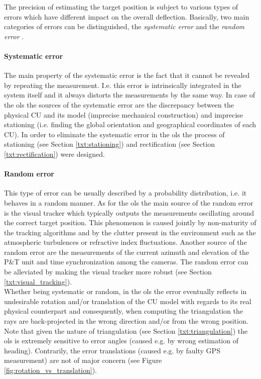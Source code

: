 The precision of estimating the target position is subject to various types of errors which have different impact on the overall deflection. Basically, two main categories of errors can be distinguished, the \textit{systematic error} and the \textit{random error} \cite{taylor1997introduction}.

\paragraph{Systematic error} The main property of the systematic error is the fact that it cannot be revealed by repeating the measurement. I.e. this error is intrinsically integrated in the system itself and it always distorts the measurements by the same way. In case of the \gls{ols} the sources of the systematic error are the discrepancy between the physical CU and its model (imprecise mechanical construction) and imprecise stationing (i.e. finding the global orientation and geographical coordinates of each CU). In order to eliminate the systematic error in the \gls{ols} the process of stationing (see Section \ref{txt:stationing}) and rectification (see Section \ref{txt:rectification}) were designed.

\paragraph{Random error} This type of error can be usually described by a probability distribution, i.e. it behaves in a random manner. As for the \gls{ols} the main source of the random error is the visual tracker which typically outputs the measurements oscillating around the correct target position. This phenomenon is caused jointly by non-maturity of the tracking algorithms and by the clutter present in the environment such as the atmospheric turbulences or refractive index fluctuations. Another source of the random error are the measurements of the current azimuth and elevation of the P\&T unit and time synchronization among the cameras. The random error can be alleviated by making the visual tracker more robust (see Section \ref{txt:visual_tracking}).\\

Whether being systematic or random, in the \gls{ols} the error eventually reflects in undesirable rotation and/or translation of the CU model with regards to its real physical counterpart and consequently, when computing the triangulation the rays are back-projected in the wrong direction and/or from the wrong position. Note that given the nature of triangulation (see Section \ref{txt:triangulation}) the \gls{ols} is extremely sensitive to error angles (caused e.g. by wrong estimation of heading). Contrarily, the error translations (caused e.g. by faulty GPS measurement) are not of major concern (see Figure \ref{fig:rotation_vs_translation}).

